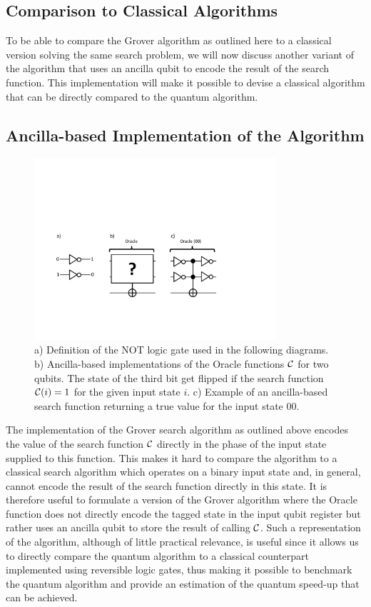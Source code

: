 \subsection{Comparison to Classical Algorithms}

To be able to compare the Grover algorithm as outlined here to a classical version solving the same search problem, we will now discuss another variant of the algorithm that uses an ancilla qubit to encode the result of the search function. This implementation will make it possible to devise a classical algorithm that can be directly compared to the quantum algorithm. 

\subsection{Ancilla-based Implementation of the Algorithm}

\begin{figure}[ht!]
	\centering
		\includegraphics[width=0.8\textwidth]{./material/papers/grover/different_oracle_implementations}
	\caption[]{a) Definition of the NOT logic gate used in the following diagrams. b) Ancilla-based implementations of the Oracle functions $\Or$ for two qubits. The state of the third bit get flipped if the search function $\Or(i)=1$ for the given input state $i$. c) Example of an ancilla-based search function returning a true value for the input state $00$.}
	\label{fig:GroverOracleImplementations}
\end{figure}

The implementation of the Grover search algorithm as outlined above encodes the value of the search function $\Or$ directly in the phase of the input state supplied to this function. This makes it hard to compare the algorithm to a classical search algorithm which operates on a binary input state and, in general, cannot encode the result of the search function directly in this state. It is therefore useful to formulate a version of the Grover algorithm where the Oracle function does not directly encode the tagged state in the input qubit register but rather uses an ancilla qubit to store the result of calling $\Or$. Such a representation of the algorithm, although of little practical relevance, is useful since it allows us to directly compare the quantum algorithm to a classical counterpart implemented using reversible logic gates, thus making it possible to benchmark the quantum algorithm and provide an estimation of the quantum speed-up that can be achieved.

